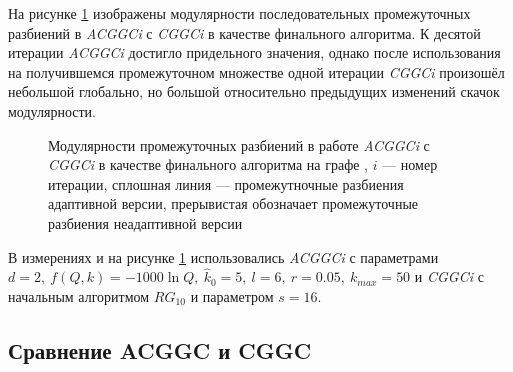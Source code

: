 На рисунке \ref{fig:es-final} изображены модулярности последовательных промежуточных разбиений в \emph{ACGGCi} с \emph{CGGCi} в качестве финального алгоритма. К десятой итерации \emph{ACGGCi} достигло придельного значения, однако после использования на получившемся промежуточном множестве одной итерации \emph{CGGCi} произошёл небольшой глобально, но большой относительно предыдущих изменений скачок модулярности.

\begin{figure}[H]
	\caption{Модулярности промежуточных разбиений в работе \emph{ACGGCi} с \emph{CGGCi} в качестве финального алгоритма на графе \emph{\celegans}, $i$ --- номер итерации, сплошная линия --- промежутночные разбиения адаптивной версии, прерывистая обозначает промежуточные разбиения неадаптивной версии}
	\label{fig:es-final}
\end{figure}

В измерениях и на рисунке \ref{fig:es-final} использовались \emph{ACGGCi} с параметрами $d = 2,\ f(Q, k) = -1000 \ln Q,\ \hat{k}_0 = 5,\ l = 6,\ r = 0.05,\ k_{max} = 50$ и \emph{CGGCi} с начальным алгоритмом $RG_{10}$ и параметром $s = 16$.



\subsection{Сравнение ACGGC и CGGC}
\label{subsec:acggc-res}

